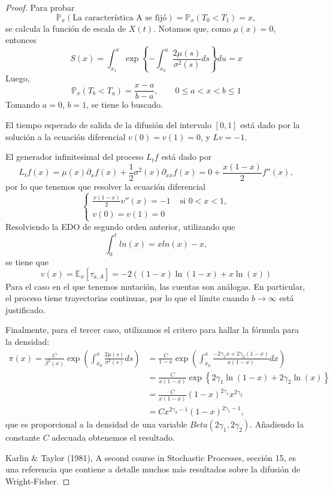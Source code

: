 \documentclass{beamer}
\renewcommand{\to}{\rightarrow}
\newcommand{\E}{\mathbb{E}}
\renewcommand{\P}{\mathbb{P}}
\renewcommand{\1}{\mathds{1}}
\theoremstyle{definition}
\theoremstyle{definition}
\theoremstyle{definition}
\theoremstyle{definition}
\theoremstyle{definition}
\begin{document}
\begin{proof} 

        Para probar 
        \[
            \P_x(\text{La característica A se fijó})=\P_x(T_0<T_1)=x,
        \]
        se calcula la función de escala de $X(t)$. Notamos que, como $\mu(x)=0$, entonces 
        \[
        S(x)=\int_{x_1}^{x}\exp \left\{-\int_{x_0}^{u}\frac{2\mu(s)}{\sigma^2(s)}ds \right\} du =x  
        \]
        Luego, 
        \[
        \P_x(T_b<T_a)=\frac{x-a}{b-a}, \qquad 0\leq a<x<b\leq1    
        \]
        Tomando $a=0$, $b=1$, se tiene lo buscado.

        El tiempo esperado de salida de la difusión del intervalo $[0,1]$ está dado por la solución 
        a la ecuación diferencial $v(0)=v(1)=0$, y $Lv=-1$.
    
        El generador infinitesimal del proceso $L_tf$ está dado por 
        \[
            L_tf(x)=\mu(x)\partial_xf(x) +\frac{1}{2}\sigma^2(x)\partial_{xx}f(x)=0+\frac{x(1-x)}{2}f''(x),
        \]
        por lo que tenemos que resolver la ecuación diferencial 
        \[
        \begin{cases}
            \frac{x(1-x)}{2}v''(x)=-1 & \text{ si } 0<x<1,\\
            v(0)=v(1)=0 
        \end{cases}    
        \]
        Resolviendo la EDO de segundo orden anterior, utilizando que 
        \[
        \int_0^{t}ln(x)= xln(x)-x,     
        \]
        se tiene que 
        \[
        v(x)=\E_x\left[\tau_{a,A}\right]=-2((1-x)\ln(1-x)+x\ln(x))    
        \]
        Para el caso en el que tenemos mutación, las cuentas son análogas. En particular, el proceso tiene trayectorias continuas, por lo que el límite
        cuando $b\to \infty$ está justificado.
        \newline

        Finalmente, para el tercer caso, utilizamos el critero para hallar la fórmula para la densidad:
        \begin{align*}
            \pi(x)=\frac{C}{\beta^2(x)}\exp \left(\int_{x_0}^{x}\frac{2\mu(s)}{\sigma^2(s)}ds\right)&=\frac{C}{1-x}\exp \left(\int_{x_0}^{x}\frac{-2\gamma_1x+2\gamma_2(1-x)}{x(1-x)}dx\right)\\
            &=\frac{C}{x(1-x)}\exp \left\{2\gamma_1 \ln(1-x)+2\gamma_2\ln(x)\right\}\\
            &=\frac{C}{x(1-x)}(1-x)^{2\gamma_1}x^{2\gamma_2}\\
            &=Cx^{2\gamma_2-1}(1-x)^{2\gamma_1-1},
        \end{align*}
        que es proporcional a la densidad de una variable $Beta(2\gamma_1,2\gamma_2)$. Añadiendo la constante 
        $C$ adecuada obtenemos el resultado.
        \newline

        Karlin \& Taylor (1981), A second course in Stochastic Processes, sección 15, es una referencia que contiene 
        a detalle muchos más resultados sobre la difusión de Wright-Fisher.
        
 \end{proof}
\end{document}
